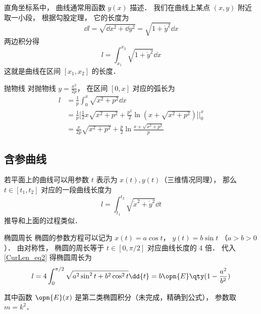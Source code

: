 

直角坐标系中， 曲线通常用函数 $y(x)$ 描述． 我们在曲线上某点 $(x, y)$ 附近取一小段， 根据勾股定理， 它的长度为
\begin{equation}
\dd{l} = \sqrt{\dd{x}^2 + \dd{y}^2} = \sqrt{1 + \dot y^2} \dd{x}
\end{equation}
两边积分得
\begin{equation}\label{CurLen_eq1}
l = \int_{x_1}^{x_2} \sqrt{1 + \dot y^2} \dd{x}
\end{equation}
这就是曲线在区间 $[x_1, x_2]$ 的长度．

\begin{example}{抛物线}
对抛物线 $y=\frac{x^2}{2p}$， 在区间 $[0,x]$ 对应的弧长为
\begin{equation}
\begin{aligned}
l& = \frac{1}{p}\int_{0}^{x}\sqrt{x^2+p^2}\dd{x}\\
&=\frac{1}{p}\bigg[\frac{1}{2}x\sqrt{x^2+p^2}+\frac{p^2}{2}\ln(x+\sqrt{x^2+p^2})\bigg]\Bigg\lvert_{0}^{x}\\
&=\frac{x}{2p}\sqrt{x^2+p^2}+\frac{p}{2}\ln\frac{x+\sqrt{x^2+p^2}}{p}
\end{aligned}
\end{equation}
\end{example}

\subsection{含参曲线}
若平面上的曲线可以用参数 $t$ 表示为 $x(t), y(t)$（三维情况同理）， 那么 $t \in [t_1, t_2]$ 对应的一段曲线长度为
\begin{equation}\label{CurLen_eq2}
l = \int_{t_1}^{t_2} \sqrt{\dot x^2 + \dot y^2} \dd{t}
\end{equation}
推导和上面的过程类似．

\begin{example}{椭圆周长}
椭圆的参数方程可以记为 $x(t) = a\cos t$， $y(t) = b\sin t$ （$a > b > 0$）． 由对称性， 椭圆的周长等于 $t \in [0, \pi/2]$ 对应曲线长度的 4 倍． 代入\autoref{CurLen_eq2} 得椭圆周长为
\begin{equation}
l = 4\int_0^{\pi/2} \sqrt{a^2\sin^2 t + b^2 \cos^2 t} \dd{t} = b \opn{E}\qty(1 - \frac{a^2}{b^2})
\end{equation}
\end{example}
其中函数 $\opn{E}(x)$ 是第二类椭圆积分（未完成，精确到公式）， 参数取 $m=k^2$．
